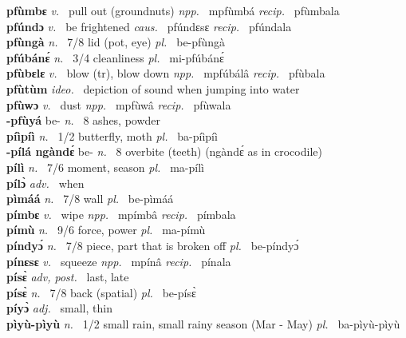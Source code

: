{\bfseries pfùmbɛ}  {\itshape v.~} pull out (groundnuts)   {\itshape npp.~} mpfùmbá {\itshape recip.~} pfùmbala  \\ 
{\bfseries pfúndɔ}  {\itshape v.~} be frightened   {\itshape caus.~} pfúndɛsɛ {\itshape recip.~} pfúndala  \\ 
{\bfseries pfùngà}  {\itshape n.~} 7/8 lid (pot, eye) {\itshape pl.~} be-pfùngà    \\ 
{\bfseries pfúbánɛ́}  {\itshape n.~} 3/4 cleanliness {\itshape pl.~} mi-pfúbánɛ́    \\ 
{\bfseries pfùbɛlɛ}  {\itshape v.~} blow (tr), blow down   {\itshape npp.~} mpfúbálâ {\itshape recip.~} pfùbala  \\ 
{\bfseries pfùtùm}  {\itshape ideo.~} depiction of sound when jumping into water    \\ 
{\bfseries pfùwɔ}  {\itshape v.~} dust   {\itshape npp.~} mpfùwâ {\itshape recip.~} pfùwala  \\ 
{\bfseries -pfùyá} be- {\itshape n.~} 8 ashes, powder    \\ 
{\bfseries píìpíì}  {\itshape n.~} 1/2 butterfly, moth {\itshape pl.~} ba-píìpíì    \\ 
{\bfseries -pílá ngàndɛ́} be- {\itshape n.~} 8 overbite (teeth) (ngàndɛ́ as in crocodile)    \\ 
{\bfseries pílì}  {\itshape n.~} 7/6 moment, season {\itshape pl.~} ma-pílì    \\ 
{\bfseries pílɔ̀}  {\itshape adv.~} when    \\ 
{\bfseries pìmáá}  {\itshape n.~} 7/8 wall {\itshape pl.~} be-pìmáá    \\ 
{\bfseries pímbɛ}  {\itshape v.~} wipe   {\itshape npp.~} mpímbâ {\itshape recip.~} pímbala  \\ 
{\bfseries pímù}  {\itshape n.~} 9/6 force, power {\itshape pl.~} ma-pímù    \\ 
{\bfseries píndyɔ́}  {\itshape n.~} 7/8 piece, part that is broken off {\itshape pl.~} be-píndyɔ́    \\ 
{\bfseries pínɛsɛ}  {\itshape v.~} squeeze   {\itshape npp.~} mpínâ {\itshape recip.~} pínala  \\ 
{\bfseries písɛ̀}  {\itshape adv, post.~} last, late    \\ 
{\bfseries písɛ̀}  {\itshape n.~} 7/8 back (spatial) {\itshape pl.~} be-písɛ̀    \\ 
{\bfseries píyɔ̀}  {\itshape adj.~} small, thin    \\ 
{\bfseries pìyù-pìyù}  {\itshape n.~} 1/2 small rain, small rainy season (Mar - May) {\itshape pl.~} ba-pìyù-pìyù    \\ 
